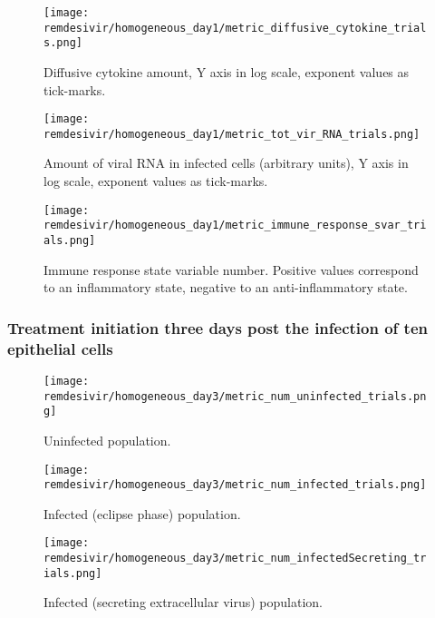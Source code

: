\begin{figure}[H]
\texttt{[image: remdesivir/homogeneous\_day1/metric\_diffusive\_cytokine\_trials.png]}
\caption{Diffusive cytokine amount, Y axis in log scale, exponent values as tick-marks.\label{fig:app:homo_regular:day1:diff_cyto}}
\end{figure}

\begin{figure}[H]
\texttt{[image: remdesivir/homogeneous\_day1/metric\_tot\_vir\_RNA\_trials.png]}
\caption{Amount of viral RNA in infected cells (arbitrary units), Y axis in log scale, exponent values as tick-marks. \label{fig:app:homo_regular:day1:vir_RNA}}
\end{figure}

\begin{figure}[H]
\texttt{[image: remdesivir/homogeneous\_day1/metric\_immune\_response\_svar\_trials.png]}
\caption{Immune response state variable number. Positive values correspond to an inflammatory state, negative to an anti-inflammatory state.\label{fig:app:homo_regular:day1:immune_var}}
\end{figure}

\subsubsection{Treatment initiation three days post the infection of ten epithelial cells}\label{sup:sec:extra_figures:homo_regular:day3}

\begin{figure}[H]
\texttt{[image: remdesivir/homogeneous\_day3/metric\_num\_uninfected\_trials.png]}
\caption{Uninfected population.\label{fig:app:homo_regular:day3:uninf}}
\end{figure}

\begin{figure}[H]
\texttt{[image: remdesivir/homogeneous\_day3/metric\_num\_infected\_trials.png]}
\caption{Infected (eclipse phase) population.\label{fig:app:homo_regular:day3:inf}}
\end{figure}

\begin{figure}[H]
\texttt{[image: remdesivir/homogeneous\_day3/metric\_num\_infectedSecreting\_trials.png]}
\caption{Infected (secreting extracellular virus) population.\label{fig:app:homo_regular:day3:infSecr}}
\end{figure}


